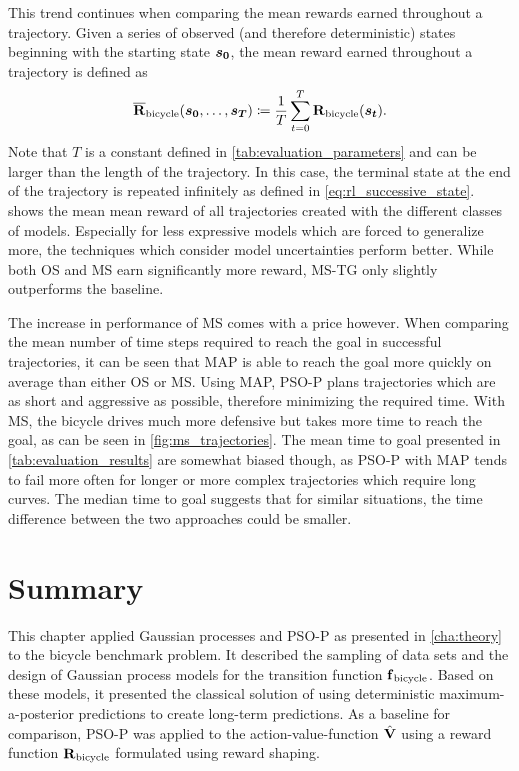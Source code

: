 This trend continues when comparing the mean rewards earned throughout a trajectory.
Given a series of observed (and therefore deterministic) states beginning with the starting state $\bm{s_0}$, the mean reward earned throughout a trajectory is defined as
\begin{align}
    \operatorname{\overline{\operatorname{\mathbf{R}}}_{\text{bicycle}}}(\bm{s_0}, \dots, \bm{s_T}) \coloneqq \frac{1}{T} \sum_{t=0}^T \operatorname{\operatorname{\mathbf{R}}_{\text{bicycle}}}(\bm{s_t}).
\end{align}
Note that $T$ is a constant defined in \cref{tab:evaluation_parameters} and can be larger than the length of the trajectory.
In this case, the terminal state at the end of the trajectory is repeated infinitely as defined in \cref{eq:rl_successive_state}.
 shows the mean mean reward of all trajectories created with the different classes of models.
Especially for less expressive models which are forced to generalize more, the techniques which consider model uncertainties perform better.
While both OS and MS earn significantly more reward, MS-TG only slightly outperforms the baseline.

The increase in performance of MS comes with a price however.
When comparing the mean number of time steps required to reach the goal in successful trajectories, it can be seen that MAP is able to reach the goal more quickly on average than either OS or MS.
Using MAP, PSO-P plans trajectories which are as short and aggressive as possible, therefore minimizing the required time.
With MS, the bicycle drives much more defensive but takes more time to reach the goal, as can be seen in \cref{fig:ms_trajectories}.
The mean time to goal presented in \cref{tab:evaluation_results} are somewhat biased though, as PSO-P with MAP tends to fail more often for longer or more complex trajectories which require long curves.
The median time to goal suggests that for similar situations, the time difference between the two approaches could be smaller.

\section{Summary}
This chapter applied Gaussian processes and PSO-P as presented in \cref{cha:theory} to the bicycle benchmark problem.
It described the sampling of data sets and the design of Gaussian process models for the transition function $\operatorname{\operatorname{\mathbf{f}}_{\text{bicycle}}}$.
Based on these models, it presented the classical solution of using deterministic maximum-a-posterior predictions to create long-term predictions.
As a baseline for comparison, PSO-P was applied to the action-value-function $\operatorname{\hat{\operatorname{\mathbf{V}}}}$ using a reward function $\operatorname{\operatorname{\mathbf{R}}_{\text{bicycle}}}$ formulated using reward shaping.

